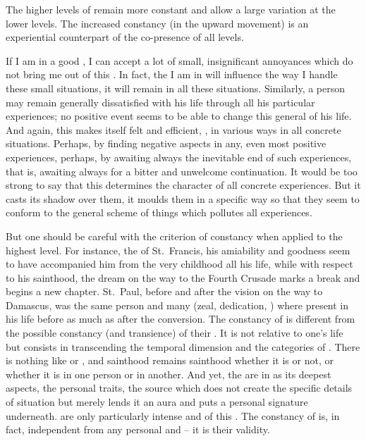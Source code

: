 \pa
The higher levels of 
 remain more constant and allow a large variation at 
the lower levels. The increased constancy (in the upward movement) is an
experiential counterpart of the co-presence of all levels. 

If I am in a good , I can accept a lot of small, insignificant
annoyances which do not bring me out of this . In fact, the  I
am in will influence the way I handle these small situations, it will remain
 in all these  situations.  Similarly, a person may 
remain generally dissatisfied with his life through all his particular
experiences; no positive event seems to be able to change this general
 of his life.  And again, this  makes itself felt and
efficient, , in various ways in all concrete situations.  Perhaps,
by finding negative aspects in any, even most positive experiences, perhaps, by
awaiting always the inevitable end of such experiences, that is, awaiting always
for a bitter and unwelcome continuation.  It would be too strong to say that
this  determines the character of all concrete experiences.  But it
casts its shadow over them, it moulds them in a specific way so that they seem
to conform to the general scheme of things which pollutes all
 experiences.

But one should be careful with the criterion of constancy when applied to the
highest level.  For instance, the  of St.~Francis, his
amiability and goodness seem to have accompanied him from the very childhood all
his life, while with respect to his sainthood, the dream on the way to the
Fourth Crusade marks a break and begins a new chapter. St.~Paul, before and
after the vision on the way to Damascus, was the same person and many
 (zeal, dedication, ) where present in his
life before as much as after the conversion.  The constancy of 
is different from the possible constancy (and transience) of their
.  It is not relative to one's life but consists in
transcending the temporal dimension and the categories of .  There
is nothing like  or , and
sainthood remains sainthood whether it is  or not, or whether it
is  in one person or in another.  And yet, the 
are  in  as its deepest aspects, the
 personal traits, the source which does not create the specific
details of  situation but merely lends it an aura and puts a personal
signature underneath.  are only particularly intense and
 of this . The constancy of  is,
in fact, independent from any personal and  -- it is
their  validity.

